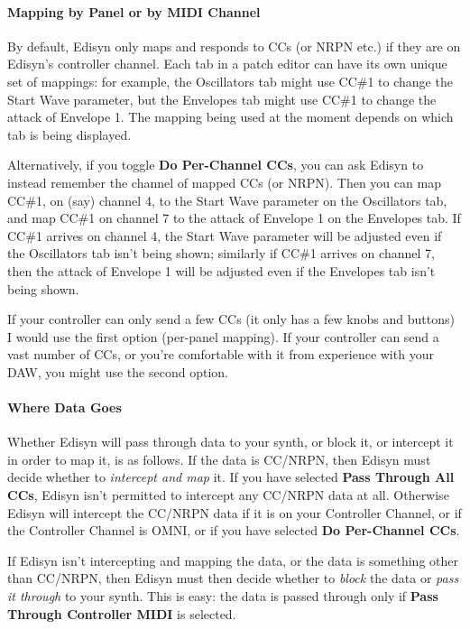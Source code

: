 \documentclass{article}
\begin{document}
\paragraph{Mapping by Panel or by MIDI Channel}

By default, Edisyn only maps and responds to CCs (or NRPN etc.) if they are on Edisyn's controller channel.   Each tab in a patch editor can have its own unique set of mappings: for example, the Oscillators tab might use CC\#1 to change the Start Wave parameter, but the Envelopes tab might use CC\#1 to change the attack of Envelope 1.  The mapping being used at the moment depends on which tab is being displayed.  

Alternatively, if you toggle {\bf Do Per-Channel CCs}, you can ask Edisyn to instead remember the channel of mapped CCs (or NRPN).  Then you can map CC\#1, on (say) channel 4, to the Start Wave parameter on the Oscillators tab, and map CC\#1 on channel 7 to the attack of Envelope 1 on the Envelopes tab.  If CC\#1 arrives on channel 4, the Start Wave parameter will be adjusted even if the Oscillators tab isn't being shown; similarly if CC\#1 arrives on channel 7, then the attack of Envelope 1 will be adjusted even if the Envelopes tab isn't being shown.

If your controller can only send a few CCs (it only has a few knobs and buttons) I would use the first option (per-panel mapping).  If your controller can send a vast number of CCs, or you're comfortable with it from experience with your DAW, you might use the second option.

\paragraph{Where Data Goes}  

Whether Edisyn will pass through data to your synth, or block it, or intercept it in order to map it, is as follows.  If the data is CC/NRPN, then Edisyn must decide whether to {\it intercept and map} it.  If you have selected {\bf Pass Through All CCs}, Edisyn isn't permitted to intercept any CC/NRPN data at all.  Otherwise Edisyn will intercept the CC/NRPN data if it is on your Controller Channel, or if the Controller Channel is OMNI, or if you have selected {\bf Do Per-Channel CCs}.

If Edisyn isn't intercepting and mapping the data, or the data is something other than CC/NRPN, then Edisyn must then decide whether to {\it block} the data or {\it pass it through} to your synth.  This is easy: the data is passed through only if {\bf Pass Through Controller MIDI} is selected.
\end{document}
